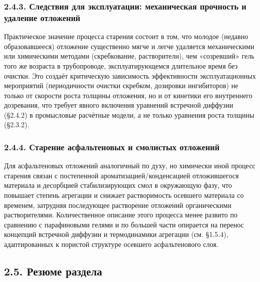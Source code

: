 \documentclass[11pt]{extarticle}
\begin{document}
\subsubsection{2.4.3. Следствия для эксплуатации: механическая прочность и удаление отложений}\label{ux441ux43bux435ux434ux441ux442ux432ux438ux44f-ux434ux43bux44f-ux44dux43aux441ux43fux43bux443ux430ux442ux430ux446ux438ux438-ux43cux435ux445ux430ux43dux438ux447ux435ux441ux43aux430ux44f-ux43fux440ux43eux447ux43dux43eux441ux442ux44c-ux438-ux443ux434ux430ux43bux435ux43dux438ux435-ux43eux442ux43bux43eux436ux435ux43dux438ux439}

Практическое значение процесса старения состоит в том, что молодое (недавно образовавшееся) отложение существенно мягче и легче удаляется механическими или химическими методами (скребкование, растворители), чем «созревший» гель того же возраста в трубопроводе, эксплуатирующемся длительное время без очистки. Это создаёт критическую зависимость эффективности эксплуатационных мероприятий (периодичности очистки скребком, дозировки ингибиторов) не только от скорости роста толщины отложения, но и от кинетики его внутреннего дозревания, что требует явного включения уравнений встречной диффузии (§2.4.2) в промысловые расчётные модели, а не только уравнения роста толщины (§2.3.2).

\subsubsection{2.4.4. Старение асфальтеновых и смолистых отложений}\label{ux441ux442ux430ux440ux435ux43dux438ux435-ux430ux441ux444ux430ux43bux44cux442ux435ux43dux43eux432ux44bux445-ux438-ux441ux43cux43eux43bux438ux441ux442ux44bux445-ux43eux442ux43bux43eux436ux435ux43dux438ux439}

Для асфальтеновых отложений аналогичный по духу, но химически иной процесс старения связан с постепенной ароматизацией/конденсацией отложившегося материала и десорбцией стабилизирующих смол в окружающую фазу, что повышает степень агрегации и снижает растворимость осевшего материала со временем, затрудняя последующее растворение отложений органическими растворителями. Количественное описание этого процесса менее развито по сравнению с парафиновыми гелями и по большей части опирается на перенос концепций встречной диффузии и термодинамики агрегации (см. §1.5.4), адаптированных к пористой структуре осевшего асфальтенового слоя.

\subsection{2.5. Резюме раздела}\label{ux440ux435ux437ux44eux43cux435-ux440ux430ux437ux434ux435ux43bux430-1}
\end{document}
